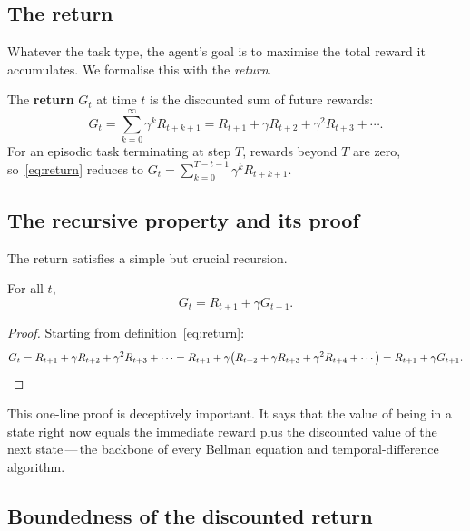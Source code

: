 \subsection*{The return}

Whatever the task type, the agent's goal is to maximise the total reward it accumulates. We formalise this with the \emph{return}.

\begin{definition}[Return]
\label{def:return}
The \textbf{return} $G_t$ at time $t$ is the discounted sum of future rewards:
\begin{equation}
\label{eq:return}
G_t = \sum_{k=0}^{\infty} \gamma^k R_{t+k+1}
    = R_{t+1} + \gamma R_{t+2} + \gamma^2 R_{t+3} + \cdots.
\end{equation}
For an episodic task terminating at step $T$, rewards beyond $T$ are zero, so~\eqref{eq:return} reduces to $G_t = \sum_{k=0}^{T-t-1} \gamma^k R_{t+k+1}$.
\end{definition}

\subsection*{The recursive property and its proof}

The return satisfies a simple but crucial recursion.

\begin{theorem}
\label{thm:recursive-return}
For all $t$,
\begin{equation}
\label{eq:return-recursion}
G_t = R_{t+1} + \gamma G_{t+1}.
\end{equation}
\end{theorem}

\begin{proof}
Starting from definition~\eqref{eq:return}:
\[
G_t = R_{t+1} + \gamma R_{t+2} + \gamma^2 R_{t+3} + \cdots
    = R_{t+1} + \gamma \bigl(R_{t+2} + \gamma R_{t+3} + \gamma^2 R_{t+4} + \cdots\bigr)
    = R_{t+1} + \gamma G_{t+1}. \qedhere
\]
\end{proof}

This one-line proof is deceptively important. It says that the value of being in a state right now equals the immediate reward plus the discounted value of the next state\,---\,the backbone of every Bellman equation and temporal-difference algorithm.

\subsection*{Boundedness of the discounted return}

